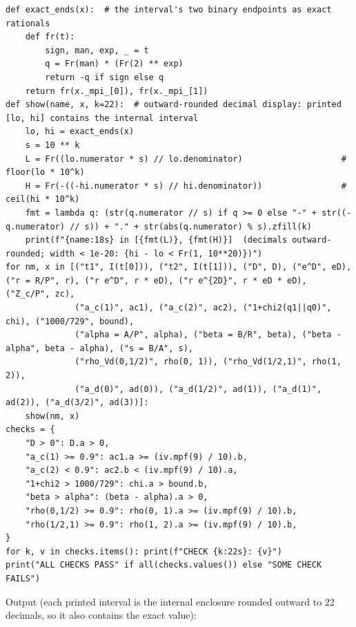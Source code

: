 \documentclass[11pt]{article}
\theoremstyle{remark}
\begin{document}
\begin{lstlisting}
def exact_ends(x):  # the interval's two binary endpoints as exact rationals
    def fr(t):
        sign, man, exp, _ = t
        q = Fr(man) * (Fr(2) ** exp)
        return -q if sign else q
    return fr(x._mpi_[0]), fr(x._mpi_[1])
def show(name, x, k=22):  # outward-rounded decimal display: printed [lo, hi] contains the internal interval
    lo, hi = exact_ends(x)
    s = 10 ** k
    L = Fr((lo.numerator * s) // lo.denominator)                    # floor(lo * 10^k)
    H = Fr(-((-hi.numerator * s) // hi.denominator))                # ceil(hi * 10^k)
    fmt = lambda q: (str(q.numerator // s) if q >= 0 else "-" + str((-q.numerator) // s)) + "." + str(abs(q.numerator) % s).zfill(k)
    print(f"{name:18s} in [{fmt(L)}, {fmt(H)}]  (decimals outward-rounded; width < 1e-20: {hi - lo < Fr(1, 10**20)})")
for nm, x in [("t1", I(t[0])), ("t2", I(t[1])), ("D", D), ("e^D", eD), ("r = R/P", r), ("r e^D", r * eD), ("r e^{2D}", r * eD * eD), ("Z_c/P", zc),
              ("a_c(1)", ac1), ("a_c(2)", ac2), ("1+chi2(q1||q0)", chi), ("1000/729", bound),
              ("alpha = A/P", alpha), ("beta = B/R", beta), ("beta - alpha", beta - alpha), ("s = B/A", s),
              ("rho_Vd(0,1/2)", rho(0, 1)), ("rho_Vd(1/2,1)", rho(1, 2)),
              ("a_d(0)", ad(0)), ("a_d(1/2)", ad(1)), ("a_d(1)", ad(2)), ("a_d(3/2)", ad(3))]:
    show(nm, x)
checks = {
    "D > 0": D.a > 0,
    "a_c(1) >= 0.9": ac1.a >= (iv.mpf(9) / 10).b,
    "a_c(2) < 0.9": ac2.b < (iv.mpf(9) / 10).a,
    "1+chi2 > 1000/729": chi.a > bound.b,
    "beta > alpha": (beta - alpha).a > 0,
    "rho(0,1/2) >= 0.9": rho(0, 1).a >= (iv.mpf(9) / 10).b,
    "rho(1/2,1) >= 0.9": rho(1, 2).a >= (iv.mpf(9) / 10).b,
}
for k, v in checks.items(): print(f"CHECK {k:22s}: {v}")
print("ALL CHECKS PASS" if all(checks.values()) else "SOME CHECK FAILS")
\end{lstlisting}
Output (each printed interval is the internal enclosure rounded outward to 22 decimals, so it also contains the exact value):
\end{document}
